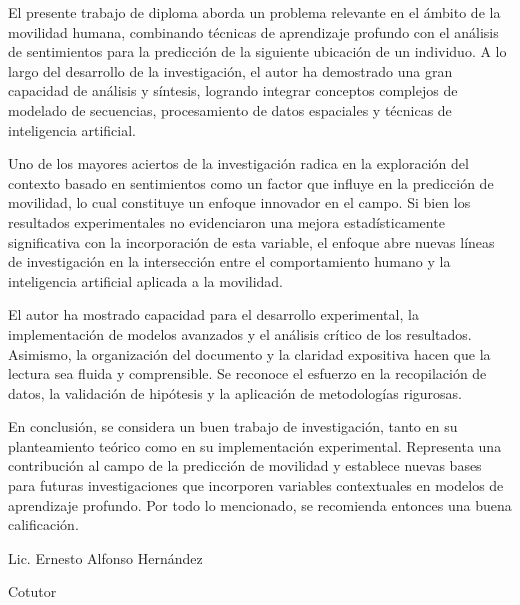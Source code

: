 \begin{opinion}
    El presente trabajo de diploma aborda un problema relevante 
    en el ámbito de la movilidad humana, combinando técnicas de 
    aprendizaje profundo con el análisis de sentimientos para la 
    predicción de la siguiente ubicación de un individuo. 
    A lo largo del desarrollo de la investigación, el autor ha 
    demostrado una gran capacidad de análisis y síntesis, logrando 
    integrar conceptos complejos de modelado de secuencias, 
    procesamiento de datos espaciales y técnicas de inteligencia artificial.

Uno de los mayores aciertos de la investigación radica en la exploración 
del contexto basado en sentimientos como un factor que influye en 
la predicción de movilidad, lo cual constituye un enfoque innovador en
el campo. Si bien los resultados experimentales 
no evidenciaron una mejora estadísticamente significativa con la 
incorporación de esta variable, el enfoque abre nuevas líneas de 
investigación en la intersección entre el comportamiento humano y 
la inteligencia artificial aplicada a la movilidad.

El autor ha mostrado capacidad para el desarrollo experimental, 
la implementación de modelos avanzados y el análisis crítico de los 
resultados. Asimismo, la organización del documento y la 
claridad expositiva hacen que la lectura sea fluida y comprensible. 
Se reconoce el esfuerzo en la recopilación de datos, la validación 
de hipótesis y la aplicación de metodologías rigurosas.

En conclusión, se considera un buen trabajo de investigación, tanto en su planteamiento 
teórico como en su implementación experimental. Representa una contribución 
al campo de la predicción de movilidad y establece nuevas bases 
para futuras investigaciones que incorporen variables contextuales en modelos 
de aprendizaje profundo. Por todo lo mencionado, se recomienda entonces una buena calificación.\\

\makebox[5cm]{\hrulefill} 

Lic. Ernesto Alfonso Hern\'andez

Cotutor


\end{opinion}